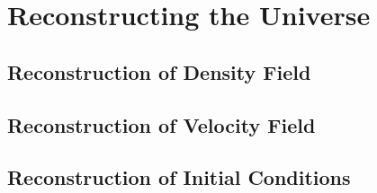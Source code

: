 \chapter{Reconstructing the Universe}

\section{Reconstruction of Density Field}

\section{Reconstruction of Velocity Field}

\section{Reconstruction of Initial Conditions}
